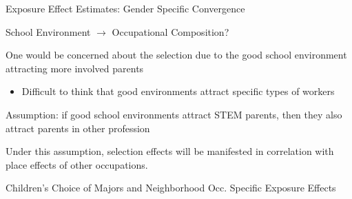 \documentclass[aspectratio=169,xcolor=dvipsnames]{beamer}
\newenvironment{wideitemize}{\itemize\addtolength{\itemsep}{10pt}}{\enditemize}
\begin{document}
\begin{frame}{Exposure Effect Estimates: Gender Specific Convergence}\label{}
    \begin{table}[!htbp]
	\centering \footnotesize
	\captionsetup{width=1.0\textwidth}
\end{table}
\end{frame}

\begin{frame}{School Environment $\rightarrow$ Occupational Composition?}
\begin{wideitemize}
    \item One would be concerned about the selection due to the good school environment attracting more involved parents 
    \begin{itemize}
        \item Difficult to think that good environments attract specific types of workers
    \end{itemize} 
    \item Assumption: if good school environments attract STEM parents, then they also attract parents in other profession

    \item Under this assumption, selection effects will be manifested in correlation with place effects of other occupations.
\end{wideitemize}
    
\end{frame}

\begin{frame}{Children's Choice of Majors and Neighborhood Occ. Specific Exposure Effects}\label{}
    \begin{table}[!htbp]
	\centering \footnotesize
	\captionsetup{width=1.0\textwidth}
\end{table}
\end{frame}
\end{document}
